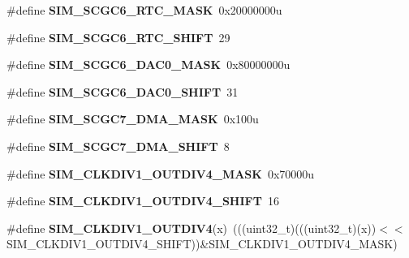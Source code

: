 \begin{DoxyCompactItemize}
\#define {\bfseries S\+I\+M\+\_\+\+S\+C\+G\+C6\+\_\+\+R\+T\+C\+\_\+\+M\+A\+SK}~0x20000000u
\item 
\mbox{\label{group___s_i_m___register___masks_gac04e5a3a7a2848658a30e7c89f791f39}} 
\#define {\bfseries S\+I\+M\+\_\+\+S\+C\+G\+C6\+\_\+\+R\+T\+C\+\_\+\+S\+H\+I\+FT}~29
\item 
\mbox{\label{group___s_i_m___register___masks_ga67d96adcce9fece065ce6a7f57f495a1}} 
\#define {\bfseries S\+I\+M\+\_\+\+S\+C\+G\+C6\+\_\+\+D\+A\+C0\+\_\+\+M\+A\+SK}~0x80000000u
\item 
\mbox{\label{group___s_i_m___register___masks_ga263123e8c1970021957fa8e72cf4a25a}} 
\#define {\bfseries S\+I\+M\+\_\+\+S\+C\+G\+C6\+\_\+\+D\+A\+C0\+\_\+\+S\+H\+I\+FT}~31
\item 
\mbox{\label{group___s_i_m___register___masks_gac559e129885604991932101719e3b368}} 
\#define {\bfseries S\+I\+M\+\_\+\+S\+C\+G\+C7\+\_\+\+D\+M\+A\+\_\+\+M\+A\+SK}~0x100u
\item 
\mbox{\label{group___s_i_m___register___masks_ga1113f1622eb2e4099653e93943a89c6e}} 
\#define {\bfseries S\+I\+M\+\_\+\+S\+C\+G\+C7\+\_\+\+D\+M\+A\+\_\+\+S\+H\+I\+FT}~8
\item 
\mbox{\label{group___s_i_m___register___masks_gaa2a972171bb5a662e1b4993b042f7180}} 
\#define {\bfseries S\+I\+M\+\_\+\+C\+L\+K\+D\+I\+V1\+\_\+\+O\+U\+T\+D\+I\+V4\+\_\+\+M\+A\+SK}~0x70000u
\item 
\mbox{\label{group___s_i_m___register___masks_ga053a7a1ffc9f3b6834679c63ca0ebe29}} 
\#define {\bfseries S\+I\+M\+\_\+\+C\+L\+K\+D\+I\+V1\+\_\+\+O\+U\+T\+D\+I\+V4\+\_\+\+S\+H\+I\+FT}~16
\item 
\mbox{\label{group___s_i_m___register___masks_ga4e380b274f15fdde19e4fbd5c341a728}} 
\#define {\bfseries S\+I\+M\+\_\+\+C\+L\+K\+D\+I\+V1\+\_\+\+O\+U\+T\+D\+I\+V4}(x)~(((uint32\+\_\+t)(((uint32\+\_\+t)(x))$<$$<$S\+I\+M\+\_\+\+C\+L\+K\+D\+I\+V1\+\_\+\+O\+U\+T\+D\+I\+V4\+\_\+\+S\+H\+I\+FT))\&S\+I\+M\+\_\+\+C\+L\+K\+D\+I\+V1\+\_\+\+O\+U\+T\+D\+I\+V4\+\_\+\+M\+A\+SK)
$$
\end{DoxyCompactItemize}
